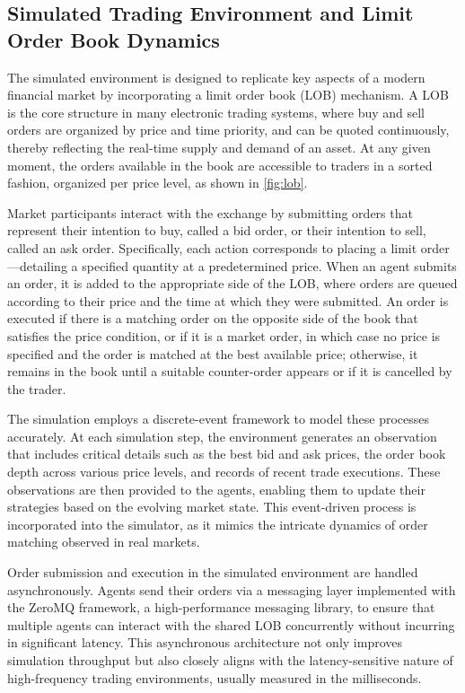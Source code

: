 \documentclass[11pt]{article}
\begin{document}
    \subsection{Simulated Trading Environment and Limit Order Book Dynamics}
    \label{subsec:environment}
    The simulated environment is designed to replicate key aspects of a modern financial market by incorporating a limit order book (LOB) mechanism.
    A LOB is the core structure in many electronic trading systems, where buy and sell orders are organized by price and time priority,
    and can be quoted continuously, thereby reflecting the real-time supply and demand of an asset.
    At any given moment, the orders available in the book are accessible to traders in a sorted fashion, organized per price level,
    as shown in \cref{fig:lob}.

    Market participants interact with the exchange by submitting orders that represent their intention to buy, called a bid order,
    or their intention to sell, called an ask order.
    Specifically, each action corresponds to placing a limit order—detailing a specified quantity at a predetermined price.
    When an agent submits an order, it is added to the appropriate side of the LOB, where orders are queued according to their price and
    the time at which they were submitted.
    An order is executed if there is a matching order on the opposite side of the book that satisfies the price condition,
    or if it is a market order, in which case no price is specified and the order is matched at the best available price;
    otherwise, it remains in the book until a suitable counter-order appears or if it is cancelled by the trader.

    The simulation employs a discrete-event framework to model these processes accurately.
    At each simulation step, the environment generates an observation that includes critical details such as the best bid and ask prices,
    the order book depth across various price levels, and records of recent trade executions.
    These observations are then provided to the agents, enabling them to update their strategies based on the evolving market state.
    This event-driven process is incorporated into the simulator, as it mimics the intricate dynamics of order matching observed in real markets.

    Order submission and execution in the simulated environment are handled asynchronously.
    Agents send their orders via a messaging layer implemented with the ZeroMQ framework, a high-performance messaging library,
    to ensure that multiple agents can interact with the shared LOB concurrently without incurring in significant latency.
    This asynchronous architecture not only improves simulation throughput but also closely aligns with
    the latency-sensitive nature of high-frequency trading environments, usually measured in the milliseconds.
\end{document}
